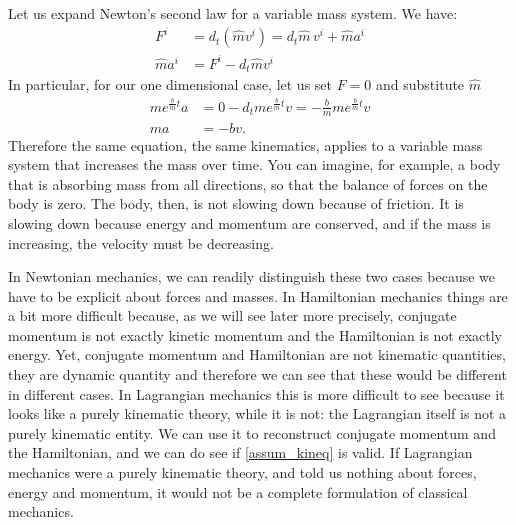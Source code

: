 Let us expand Newton's second law for a variable mass system. We have:
\begin{equation}
	\begin{aligned}
		F^i &= d_t (\hat{m}v^i) = d_t \hat{m} \, v^i + \hat{m} a^i \\
		\hat{m} a^i &= F^i - d_t \hat{m} v^i
	\end{aligned}
\end{equation}
In particular, for our one dimensional case, let us set $F=0$ and substitute $\hat{m}$
\begin{equation}
	\begin{aligned}
		m e^{\frac{b}{m}t} a &= 0 - d_t m e^{\frac{b}{m}t} v = -\frac{b}{m} m e^{\frac{b}{m}t} v \\
		ma &= -bv.
	\end{aligned}
\end{equation}
Therefore the same equation, the same kinematics, applies to a variable mass system that increases the mass over time. You can imagine, for example, a body that is absorbing mass from all directions, so that the balance of forces on the body is zero. The body, then, is not slowing down because of friction. It is slowing down because energy and momentum are conserved, and if the mass is increasing, the velocity must be decreasing.

In Newtonian mechanics, we can readily distinguish these two cases because we have to be explicit about forces and masses. In Hamiltonian mechanics things are a bit more difficult because, as we will see later more precisely, conjugate momentum is not exactly kinetic momentum and the Hamiltonian is not exactly energy. Yet, conjugate momentum and Hamiltonian are not kinematic quantities, they are dynamic quantity and therefore we can see that these would be different in different cases. In Lagrangian mechanics this is more difficult to see because it looks like a purely kinematic theory, while it is not: the Lagrangian itself is not a purely kinematic entity. We can use it to reconstruct conjugate momentum and the Hamiltonian, and we can do see if \ref{assum_kineq} is valid. If Lagrangian mechanics were a purely kinematic theory, and told us nothing about forces, energy and momentum, it would not be a complete formulation of classical mechanics.

